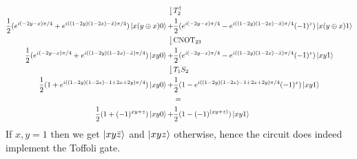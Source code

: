 \documentclass[a4paper,12pt]{article}
\begin{document}
\begin{align*}
\big\downarrow & T_2^\dagger\\
\frac{1}{2}(e^{i(-2y-x)\pi/4}+e^{i((1-2y)(1-2x) -\bar{x})\pi/4})\ket{x(y\oplus x)0} 
+&\frac{1}{2}(e^{i(-2y-x)\pi/4}-e^{i((1-2y)(1-2x) -\bar{x})\pi/4}(-1)^z)\ket{x(y\oplus x)1}\\
\big\downarrow &\text{CNOT}_{23}\\
\frac{1}{2}(e^{i(-2y-x)\pi/4}+e^{i((1-2y)(1-2x) -\bar{x})\pi/4})\ket{xy0} 
+&\frac{1}{2}(e^{i(-2y-x)\pi/4}-e^{i((1-2y)(1-2x) -\bar{x})\pi/4}(-1)^z)\ket{xy1}\\
\big\downarrow &T_1S_2\\
\frac{1}{2}(1+e^{i((1-2y)(1-2x) -1+2x+2y)\pi/4})\ket{xy0} 
+&\frac{1}{2}(1-e^{i((1-2y)(1-2x) -1+2x+2y)\pi/4}(-1)^z)\ket{xy1}\\
&=\\
\frac{1}{2}(1+(-1)^{xy+z})\ket{xy0} 
+&\frac{1}{2}(1-(-1)^{(xy+z)})\ket{xy1}\\
\end{align*}
\endgroup
If $x,y=1$ then we get $\ket{xy\bar{z}}$ and $\ket{xyz}$ otherwise, hence the circuit does indeed implement the
Toffoli gate.
\end{document}
